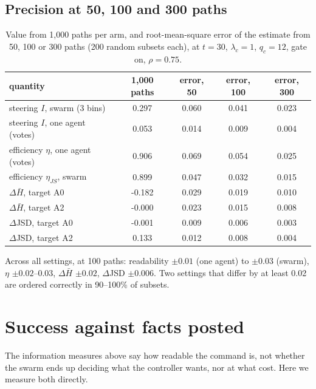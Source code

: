 \documentclass[10pt,a4paper]{article}
\begin{document}
\subsection{Precision at 50, 100 and 300 paths}

\begin{table}[H]
\centering\small
\caption{Value from 1{,}000 paths per arm, and root-mean-square error of the estimate from 50, 100
or 300 paths (200 random subsets each), at $t = 30$, $\lambda_c = 1$, $q_c = 12$, gate on, $\rho = 0.75$.}
\label{tab:effprec}
\begin{tabular}{lcccc}
\toprule
quantity & 1{,}000 paths & error, 50 & error, 100 & error, 300 \\
\midrule
steering $I$, swarm (3 bins) & 0.297 & 0.060 & 0.041 & 0.023 \\
steering $I$, one agent (votes) & 0.053 & 0.014 & 0.009 & 0.004 \\
efficiency $\eta$, one agent (votes) & 0.906 & 0.069 & 0.054 & 0.025 \\
efficiency $\eta_{JS}$, swarm & 0.899 & 0.047 & 0.032 & 0.015 \\
$\Delta\bar H$, target A0 & -0.182 & 0.029 & 0.019 & 0.010 \\
$\Delta\bar H$, target A2 & -0.000 & 0.023 & 0.015 & 0.008 \\
$\Delta$JSD, target A0 & -0.001 & 0.009 & 0.006 & 0.003 \\
$\Delta$JSD, target A2 & 0.133 & 0.012 & 0.008 & 0.004 \\
\bottomrule
\end{tabular}
\end{table}

\noindent Across all settings, at 100 paths: readability $\pm0.01$ (one agent) to $\pm0.03$ (swarm),
$\eta$ $\pm0.02$--$0.03$, $\Delta\bar H$ $\pm0.02$, $\Delta$JSD $\pm0.006$. Two settings that differ by
at least 0.02 are ordered correctly in 90--100\% of subsets.

\section{Success against facts posted}\label{sec:success}

The information measures above say how readable the command is, not whether the swarm ends up
deciding what the controller wants, nor at what cost. Here we measure both directly.
\end{document}
